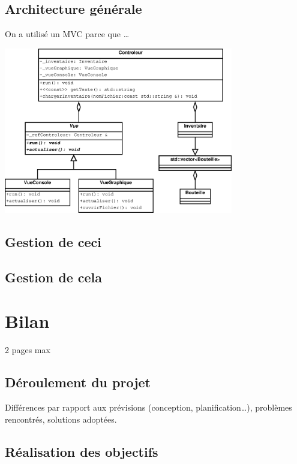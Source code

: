 \documentclass[a4paper,oneside]{article}
\begin{document}
\subsection{Architecture générale}
On a utilisé un MVC parce que …

\begin{center}
\includegraphics[width=10cm]{architecture_generale.eps}
\end{center}


\subsection{Gestion de ceci}

\subsection{Gestion de cela}

\clearpage



\section{Bilan}

2 pages max 

\subsection{Déroulement du projet}

Différences par rapport aux prévisions (conception, planification…), problèmes rencontrés, solutions adoptées.


\subsection{Réalisation des objectifs }
\end{document}

